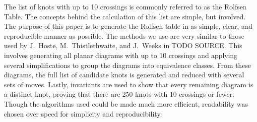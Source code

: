 
\theorems
\diagrams

\begin{paperabs}
The list of knots with up to 10 crossings is commonly referred to as the Rolfsen
Table.
The concepts behind the calculation of this list are simple, but involved.
The purpose of this paper is to generate the Rolfsen table in as simple, clear,
and reproducible manner as possible.
The methods we use are very similar to those used by J.~Hoste,
M.~Thistlethwaite, and J.~Weeks in TODO SOURCE.
This involves generating all planar diagrams with up to 10 crossings and
applying several simplifications to group the diagrams into equivalence classes.
From these diagrams, the full list of candidate knots is generated and reduced
with several sets of moves.
Lastly, invariants are used to show that every remaining diagram is a distinct
knot, proving that there are 250 knots with 10 crossings or fewer.
Though the algorithms used could be made much more efficient, readability was
chosen over speed for simplicity and reproducibility.
\end{paperabs}
